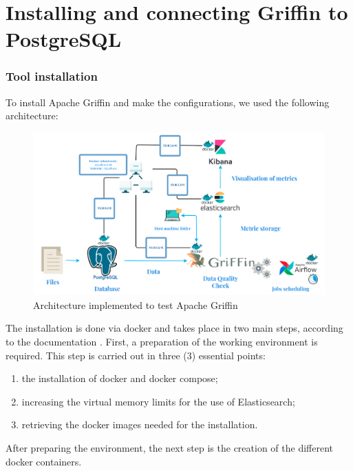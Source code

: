 \section{Installing and connecting Griffin to PostgreSQL}
\subsubsection{Tool installation}
To install Apache Griffin and make the configurations, we used the following architecture:
\begin{figure}[H]
    \caption{Architecture implemented to test Apache Griffin}  \label{fig:xray}
    \begin{center}
      \includegraphics[scale=0.40]{Main/Static/Arch_eng.png} 
    \end{center}
\end{figure}
The installation is done via docker and takes place in two main steps, according to the documentation \cite{ApacheGriffinDocDocker}. First, a preparation of the working environment is required. This step is carried out in three (3) essential points:
\begin{enumerate}[parsep=0cm,itemsep=0cm]
    \item the installation of docker and docker compose;
    \item increasing the virtual memory limits for the use of Elasticsearch;
    \item retrieving the docker images needed for the installation. 
\end{enumerate}
After preparing the environment, the next step is the creation of the different docker containers.

